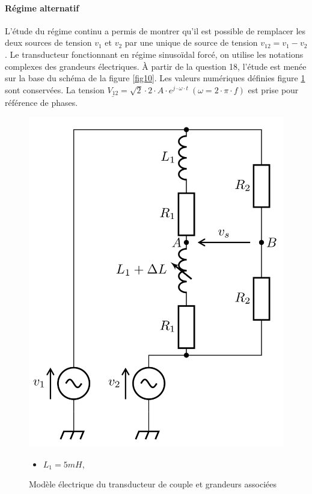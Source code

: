 \paragraph{Régime alternatif} L'étude du régime continu a permis de montrer qu'il est possible de remplacer les deux sources de tension $v_1$ et $v_2$ par une unique de source de tension $v_{12}= v_1 - v_2$. Le transducteur fonctionnant en régime sinusoïdal forcé, on utilise les notations complexes des grandeurs électriques. À partir de la question 18, l'étude est menée sur la base du schéma de la figure \ref{fig10}. Les valeurs numériques définies figure \ref{fig09} sont conservées. La tension $\underline{V_{12}}=\sqrt{2}\cdot 2\cdot A\cdot e^{j\cdot \omega\cdot t}\ (\omega = 2\cdot \pi\cdot f)$ est prise pour référence de phases.

\begin{figure}[ht!]
\begin{minipage}{0.45\linewidth}
\begin{center}
\includegraphics[width=.75\linewidth]{img/fig09}
\caption{\label{fig09}Modèle électrique du transducteur de couple et grandeurs associées}
\end{center}
\end{minipage}\hfill
\begin{minipage}{0.45\linewidth}
\begin{itemize}
 \item $L_1=5mH$,

\end{itemize}
\end{minipage}
\end{figure}
